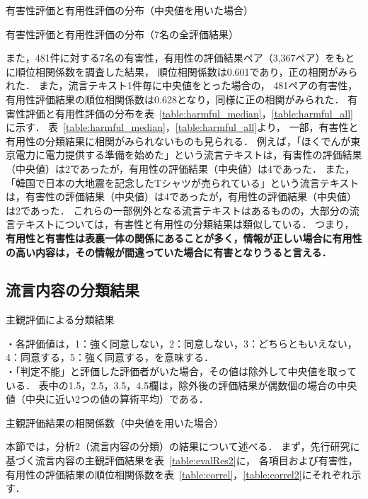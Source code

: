 \documentclass[japanese]{jnlp_1.4}
\begin{document}
\begin{table}[b]
\caption{有害性評価と有用性評価の分布（中央値を用いた場合）}
\label{table:harmful_median}

\end{table}
\begin{table}[b]
\caption{有害性評価と有用性評価の分布（7名の全評価結果）}
\label{table:harmful_all}

\end{table}

また，481件に対する7名の有害性，有用性の評価結果ペア（3,367ペア）をもとに順位相関係数を調査した結果，
順位相関係数は0.601であり，正の相関がみられた．
また，流言テキスト1件毎に中央値をとった場合の，
481ペアの有害性，有用性評価結果の順位相関係数は0.628となり，同様に正の相関がみられた．
有害性評価と有用性評価の分布を表~\ref{table:harmful_median}，\ref{table:harmful_all}に示す．
表~\ref{table:harmful_median}，\ref{table:harmful_all}より，
一部，有害性と有用性の分類結果に相関がみられないものも見られる．
例えば，「ほくでんが東京電力に電力提供する準備を始めた」という流言テキストは，有害性の評価結果（中央値）は2であったが，有用性の評価結果（中央値）は4であった．
また，「韓国で日本の大地震を記念したTシャツが売られている」という流言テキストは，有害性の評価結果（中央値）は4であったが，有用性の評価結果（中央値）は2であった．
これらの一部例外となる流言テキストはあるものの，大部分の流言テキストについては，有害性と有用性の分類結果は類似している．
つまり，{\bf 有用性と有害性は表裏一体の関係にあることが多く，情報が正しい場合に有用性の高い内容は，その情報が間違っていた場合に有害となりうると言える．}


\subsection{流言内容の分類結果}
\label{sec:ruaRes}

\begin{table}[b]
\caption{主観評価による分類結果}
\label{table:evalRes2}

\par\vspace{0.5zw}
\small
・各評価値は，1：強く同意しない，2：同意しない，3：どちらともいえない，4：同意する，5：強く同意する，を意味する．\\
・「判定不能」と評価した評価者がいた場合，その値は除外して中央値を取っている．
表中の1.5，2.5，3.5，4.5欄は，除外後の評価結果が偶数個の場合の中央値（中央に近い2つの値の算術平均）である．\par
\end{table}
\begin{table}[b]
\caption{主観評価結果の相関係数（中央値を用いた場合）}
\label{table:correl}

\end{table}
本節では，分析2（流言内容の分類）の結果について述べる．
まず，先行研究に基づく流言内容の主観評価結果を表~\ref{table:evalRes2}に，
各項目および有害性，有用性の評価結果の順位相関係数を表~\ref{table:correl}，\ref{table:correl2}にそれぞれ示す．
\end{document}
